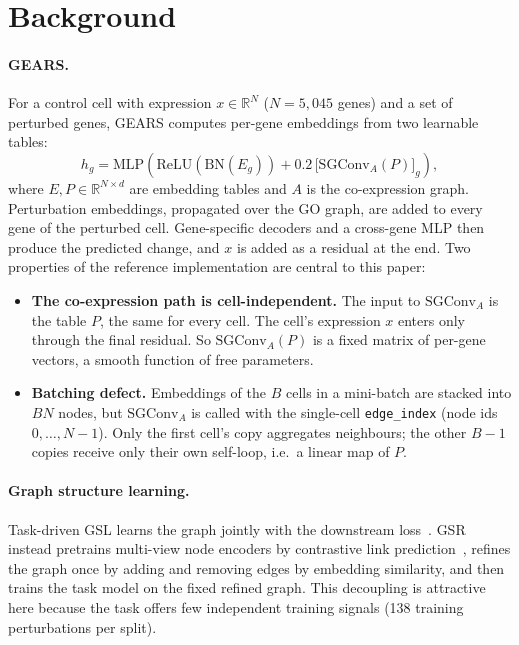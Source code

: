 \documentclass[11pt]{article}
\newcommand{\GEARS}{\textsc{GEARS}}
\begin{document}
\section{Background}

\paragraph{GEARS.} For a control cell with expression $x\in\mathbb{R}^{N}$ ($N{=}5{,}045$ genes) and a set of
perturbed genes, \GEARS{} computes per-gene embeddings from two learnable tables:
\begin{equation}
  h_g = \mathrm{MLP}\!\left(\mathrm{ReLU}(\mathrm{BN}(E_g)) + 0.2\,\big[\mathrm{SGConv}_{A}(P)\big]_g\right),
  \label{eq:gears}
\end{equation}
where $E, P \in \mathbb{R}^{N\times d}$ are embedding tables and $A$ is the co-expression graph. Perturbation
embeddings, propagated over the GO graph, are added to every gene of the perturbed cell. Gene-specific decoders and
a cross-gene MLP then produce the predicted change, and $x$ is added as a residual at the end. Two properties of the
reference implementation are central to this paper:
\begin{itemize}
  \item \textbf{The co-expression path is cell-independent.} The input to $\mathrm{SGConv}_A$ is the table $P$, the
        same for every cell. The cell's expression $x$ enters only through the final residual. So
        $\mathrm{SGConv}_A(P)$ is a fixed matrix of per-gene vectors, a smooth function of free parameters.
  \item \textbf{Batching defect.} Embeddings of the $B$ cells in a mini-batch are stacked into $BN$ nodes, but
        $\mathrm{SGConv}_A$ is called with the single-cell \texttt{edge\_index} (node ids $0,\dots,N{-}1$). Only the
        first cell's copy aggregates neighbours; the other $B{-}1$ copies receive only their own self-loop, i.e.\ a
        linear map of $P$.
\end{itemize}

\paragraph{Graph structure learning.} Task-driven GSL learns the graph jointly with the downstream
loss~\cite{chen2020idgl,franceschi2019lds}. GSR~\cite{zhao2023gsr} instead pretrains multi-view node encoders by
contrastive link prediction~\cite{oord2018infonce,he2020moco}, refines the graph once by adding and removing edges
by embedding similarity, and then trains the task model on the fixed refined graph. This decoupling is attractive
here because the task offers few independent training signals (138 training perturbations per split).
\end{document}
